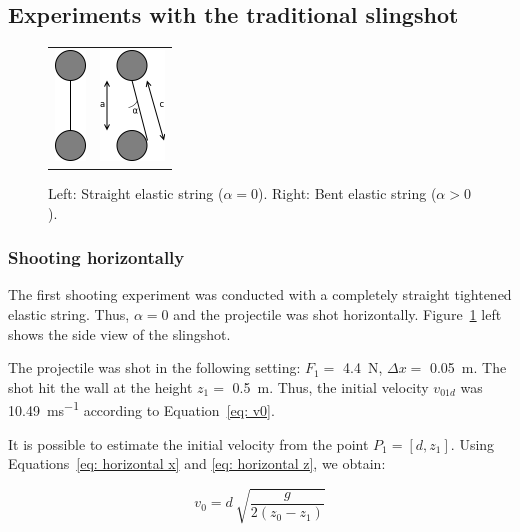 				
	\subsection{Experiments with the traditional slingshot}
	
		\begin{figure}[h]
		\centering
		\begin{tabular}{cc}
		\includegraphics[height=111px]{string_horizontal.png}
		&
		\includegraphics[height=111px]{string_upwards.png}
		\end{tabular}
		\caption{Left: Straight elastic string ($ \alpha = 0$). Right: Bent elastic string ($ \alpha > 0$).}
		\label{fig:shooting string}
		\end{figure}		
	
		\subsubsection{Shooting horizontally}
			The first shooting experiment was conducted with a completely straight tightened elastic string. Thus, $ \alpha = 0$ and the projectile was shot horizontally. Figure~\ref{fig:shooting string}	left shows the side view of the slingshot.
			
			The projectile was shot in the following setting: $ F_1 = $ \SI{4.4}{N}, $ \Delta x = $ \SI{0.05}{m}. The shot hit the wall at the height $ z_1 = $ \SI{0.5}{m}. Thus, the initial velocity $ v_{01d}$ was \SI{10.49}{ms^{-1}} according to Equation~\eqref{eq: v0}.
			
			It is possible to estimate the initial velocity from the point $ P_1 = [d, z_1]$. Using Equations~\eqref{eq: horizontal x} and \eqref{eq: horizontal z}, we obtain:
			
			\begin{equation}
				v_0 = d \: \sqrt{\frac{g}{2(z_0 - z_1)}}
			\end{equation}
			

